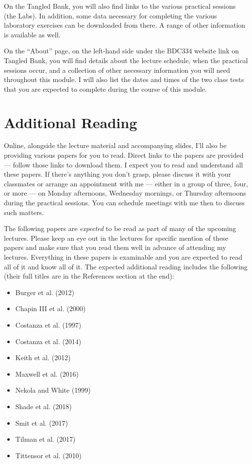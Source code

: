 \documentclass[
  10pt,
]{book}
\providecommand{\tightlist}{%
  \setlength{\itemsep}{0pt}\setlength{\parskip}{0pt}}
\begin{document}
On the Tangled Bank, you will also find links to the various practical
sessions (the Labs). In addition, some data necessary for completing the
various laboratory exercises can be downloaded from there. A range of
other information is available as well.

On the ``About'' page, on the left-hand side under the BDC334 website
link on Tangled Bank, you will find details about the lecture schedule,
when the practical sessions occur, and a collection of other necessary
information you will need throughout this module. I will also list the
dates and times of the two class tests that you are expected to complete
during the course of this module.

\section{Additional Reading}\label{additional-reading}

Online, alongside the lecture material and accompanying slides, I'll
also be providing various papers for you to read. Direct links to the
papers are provided --- follow those links to download them. I expect
you to read and understand all these papers. If there's anything you
don't grasp, please discuss it with your classmates or arrange an
appointment with me --- either in a group of three, four, or more --- on
Monday afternoons, Wednesday mornings, or Thursday afternoons during the
practical sessions. You can schedule meetings with me then to discuss
such matters.

The following papers are \emph{expected} to be read as part of many of
the upcoming lectures. Please keep an eye out in the lectures for
specific mention of these papers and make sure that you read them well
in advance of attending my lectures. Everything in these papers is
examinable and you are expected to read all of it and know all of it.
The expected additional reading includes the following (their full
titles are in the References section at the end):

\begin{itemize}
\tightlist
\item
  Burger et al. (2012)
\item
  Chapin III et al. (2000)
\item
  Costanza et al. (1997)
\item
  Costanza et al. (2014)
\item
  Keith et al. (2012)
\item
  Maxwell et al. (2016)
\item
  Nekola and White (1999)
\item
  Shade et al. (2018)
\item
  Smit et al. (2017)
\item
  Tilman et al. (2017)
\item
  Tittensor et al. (2010)
\end{itemize}
\end{document}
